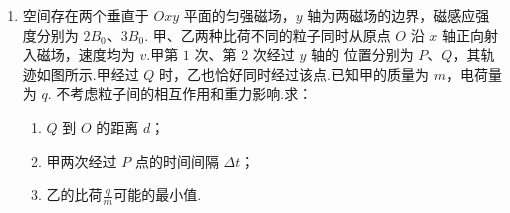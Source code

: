 \begin{enumerate}
\item
空间存在两个垂直于 $ Oxy $ 平面的匀强磁场，$ y $ 轴为两磁场的边界，磁感应强度分别为 $ 2B_{0} $、$ 3B_{0} $.
甲、乙两种比荷不同的粒子同时从原点 $ O $ 沿 $ x $ 轴正向射入磁场，速度均为 $ v $.甲第 $ 1 $ 次、第 $ 2 $ 次经过 $ y $ 轴的
位置分别为 $ P $、$ Q $，其轨迹如图所示.甲经过 $ Q $ 时，乙也恰好同时经过该点.已知甲的质量为 $ m $，电荷量为 $ q $.
不考虑粒子间的相互作用和重力影响.求：
\begin{enumerate}
\item
$ Q $ 到 $ O $ 的距离 $ d $；
\item 
甲两次经过 $ P $ 点的时间间隔 $ \Delta t $；
\item 
乙的比荷$ \frac{q}{m} $可能的最小值.
\end{enumerate}
\begin{figure}[h!]
\flushright

\end{figure}








\end{enumerate}

